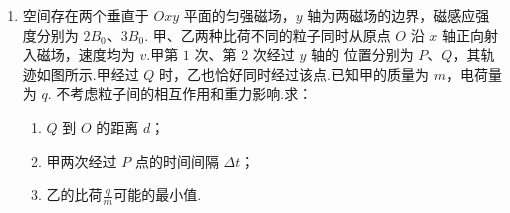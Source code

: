 \begin{enumerate}
\item
空间存在两个垂直于 $ Oxy $ 平面的匀强磁场，$ y $ 轴为两磁场的边界，磁感应强度分别为 $ 2B_{0} $、$ 3B_{0} $.
甲、乙两种比荷不同的粒子同时从原点 $ O $ 沿 $ x $ 轴正向射入磁场，速度均为 $ v $.甲第 $ 1 $ 次、第 $ 2 $ 次经过 $ y $ 轴的
位置分别为 $ P $、$ Q $，其轨迹如图所示.甲经过 $ Q $ 时，乙也恰好同时经过该点.已知甲的质量为 $ m $，电荷量为 $ q $.
不考虑粒子间的相互作用和重力影响.求：
\begin{enumerate}
\item
$ Q $ 到 $ O $ 的距离 $ d $；
\item 
甲两次经过 $ P $ 点的时间间隔 $ \Delta t $；
\item 
乙的比荷$ \frac{q}{m} $可能的最小值.
\end{enumerate}
\begin{figure}[h!]
\flushright

\end{figure}








\end{enumerate}

